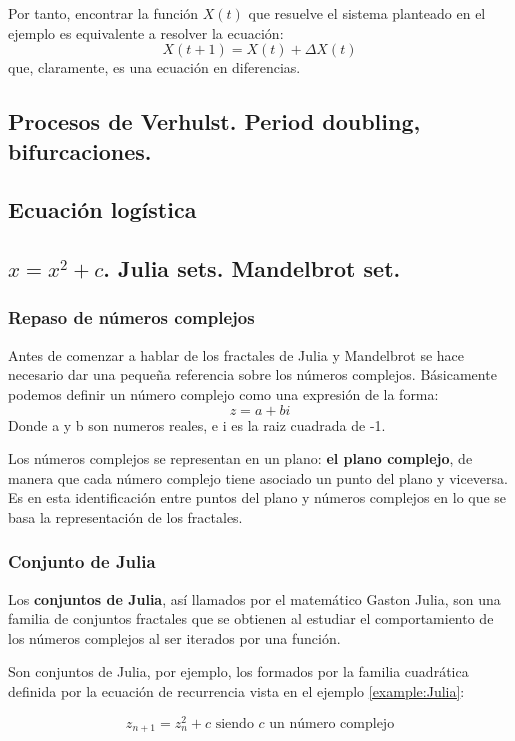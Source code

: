 Por tanto, encontrar la función $X(t)$ que resuelve el sistema planteado en el ejemplo es equivalente a resolver la ecuación:
\[X(t+1)=X(t)+ΔX(t)\]
que, claramente, es una ecuación en diferencias.


\subsection{Procesos de Verhulst. Period doubling, bifurcaciones.}
\subsection{Ecuación logística}
\subsection{$x=x^2+c$. Julia sets. Mandelbrot set.}

\subsubsection{Repaso de números complejos}
Antes de comenzar a hablar de los fractales de Julia y Mandelbrot se hace necesario dar una pequeña referencia sobre los números complejos. Básicamente podemos definir un número complejo como una expresión de la forma:
\[z=a +bi\]
Donde a y b son numeros reales, e i es la raiz cuadrada de -1.

Los números complejos se representan en un plano: \textbf{el plano complejo}, de manera que cada número complejo tiene asociado un punto del plano y viceversa. Es en esta identificación entre puntos del plano y números complejos en lo que se basa la representación de los fractales.

\subsubsection{Conjunto de Julia}
\begin{definition}
Los \textbf{conjuntos de Julia}, así llamados por el matemático Gaston Julia, son una familia de conjuntos fractales que se obtienen al estudiar el comportamiento de los números complejos al ser iterados por una función.

Son conjuntos de Julia, por ejemplo, los formados por la familia cuadrática definida por la ecuación de recurrencia vista en el ejemplo \ref{example:Julia}:

\begin{equation}
z_{n+1} = z_n^2+c \text{ siendo } c \text{ un número complejo}
\end{equation}\label{eq:Julia}

\end{definition}

